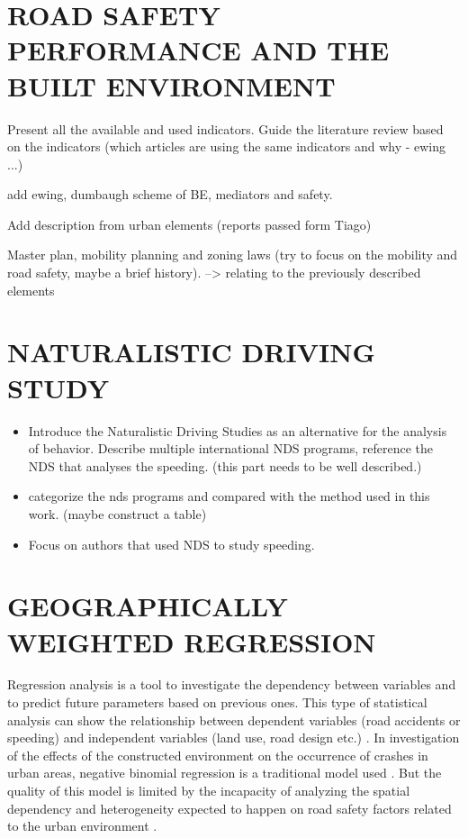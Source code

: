\section{ROAD SAFETY PERFORMANCE AND THE BUILT ENVIRONMENT}






Present all the available and used indicators. Guide the literature review based on the indicators (which articles are using the same indicators and why - ewing ...)

add ewing, dumbaugh scheme of BE, mediators and safety.

Add description from urban elements (reports passed form Tiago)

Master plan, mobility planning and zoning laws (try to focus on the mobility and road safety, maybe a brief history). --> relating to the previously described elements

\section{NATURALISTIC DRIVING STUDY}

\begin{itemize}
    \item Introduce the Naturalistic Driving Studies as an alternative for the analysis of behavior. Describe multiple international NDS programs, reference the NDS that analyses the speeding. (this part needs to be well described.)
    \item categorize the nds programs and compared with the method used in this work. (maybe construct a table)
    \item Focus on authors that used NDS to study speeding. 
\end{itemize}

\section{GEOGRAPHICALLY WEIGHTED REGRESSION}

Regression analysis is a tool to investigate the dependency between variables and to predict future parameters based on previous ones. This type of statistical analysis can show the relationship between dependent variables (road accidents or speeding) and independent variables (land use, road design etc.) \cite{Lindley1987}. In investigation of the effects of the constructed environment on the occurrence of crashes in urban areas, negative binomial regression is a traditional model used \cite{Wei2013, Zhang2014}. But the quality of this model is limited by the incapacity of analyzing the spatial dependency and heterogeneity expected to happen on road safety factors related to the urban environment \cite{Obelheiro2019}.

